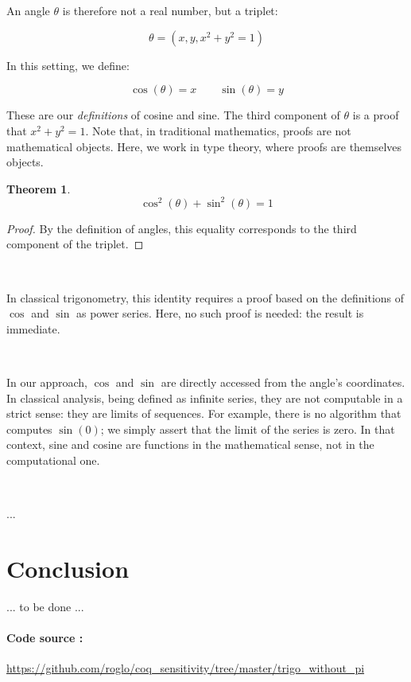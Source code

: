 \documentclass[11pt]{article}
\newtheorem{theorem}{Theorem}
\begin{document}
\

\

\noindent An angle \( \theta \) is therefore not a real number, but a triplet:

\[
\theta = (x, y, x^2 + y^2 = 1)
\]

\noindent In this setting, we define:

\[
\cos(\theta) = x \qquad \sin(\theta) = y
\]

\noindent These are our \emph{definitions} of cosine and sine. The
third component of \( \theta \) is a proof that \( x^2 + y^2 = 1
\). Note that, in traditional mathematics, proofs are not mathematical
objects. Here, we work in type theory, where proofs are themselves
objects.

\begin{theorem}
\[
\cos^2(\theta) + \sin^2(\theta) = 1
\]
\end{theorem}

\begin{proof}
By the definition of angles, this equality corresponds to the third
component of the triplet.
\end{proof}

\

\noindent In classical trigonometry, this identity requires a proof
based on the definitions of \( \cos \) and \( \sin \) as power
series. Here, no such proof is needed: the result is immediate.

\

\noindent In our approach, \( \cos \) and \( \sin \) are directly
accessed from the angle's coordinates. In classical analysis, being
defined as infinite series, they are not computable in a strict sense:
they are limits of sequences. For example, there is no algorithm that
computes \( \sin(0) \); we simply assert that the limit of the series
is zero. In that context, sine and cosine are functions in the
mathematical sense, not in the computational one.

\

...

\section{Conclusion}

... to be done ...

\paragraph{Code source :}
\url{https://github.com/roglo/coq_sensitivity/tree/master/trigo_without_pi}
\end{document}
